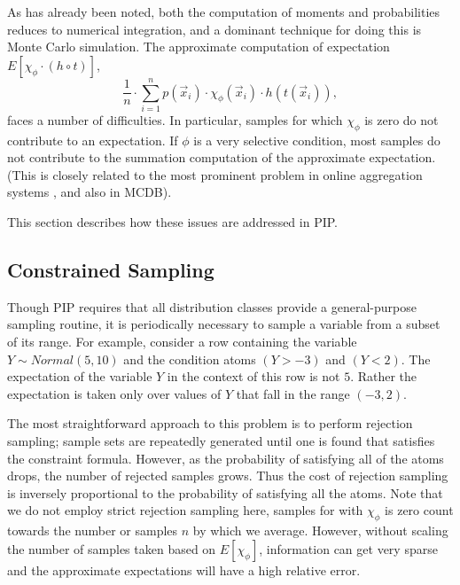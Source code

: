 

As has already been noted, both the computation of moments and probabilities reduces to numerical integration, and a dominant technique for doing this is Monte Carlo simulation. The approximate computation of expectation
$E[\chi_\phi \cdot (h \circ t)]$,
\begin{equation}
\frac{1}{n} \cdot \sum_{i=1}^n p(\vec{x}_i) \cdot \chi_\phi(\vec{x}_i) \cdot
h(t(\vec{x}_i)),
\end{equation}
faces a number of difficulties.  In particular, samples for which $\chi_{\phi}$ is zero do not contribute to an expectation.  If $\phi$ is a very selective condition, most samples do not contribute to the summation computation of the approximate expectation.  (This is closely related to the most prominent problem in online aggregation systems \cite{OnlineAggregation,DBO}, and also in MCDB).

This section describes how these issues are addressed in PIP.


\subsection{Constrained Sampling}
\label{subsec:csampling}


Though  PIP   requires  that   all  distribution  classes   provide  a
general-purpose  sampling  routine, it  is  periodically necessary  to
sample a variable from a subset of its range.  For example, consider a
row  containing  the variable  $Y \sim Normal(5,10)$  and the  condition
atoms $(Y >  -3)$ and $(Y < 2)$.  The expectation  of the variable $Y$
in the  context of  this row  is not $5$.   Rather the  expectation is
taken only over values of $Y$ that fall in the range $(-3,2)$.

The  most  straightforward approach  to  this  problem  is to  perform
rejection sampling; sample sets  are repeatedly generated until one is
found  that  satisfies  the   constraint  formula.   However,  as  the
probability  of satisfying  all  of  the atoms  drops,  the number  of
rejected  samples  grows.  Thus  the  cost  of  rejection sampling  is
inversely proportional to the probability of satisfying all the atoms.
Note that we do not employ strict rejection sampling here, samples for with $\chi_{\phi}$ is zero count towards the number or samples $n$ by which we average.  However, without scaling the number of samples taken based on $E[\chi_\phi]$, information can get very sparse and the approximate expectations will have a high relative error. 

